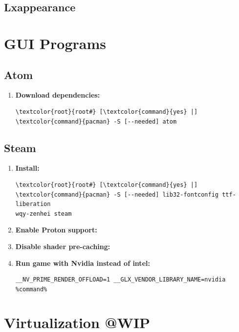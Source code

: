 \documentclass[10pt, a4paper, onecolumn, oneside, titlepage, openany]{book}
\begin{document}
\section{Lxappearance}


\chapter{GUI Programs}
\section{Atom}
\begin{enumerate}
    \item \textbf{Download dependencies:}
\begin{Verbatim}[commandchars=\\\{\}]
\textcolor{root}{root#} [\textcolor{command}{yes} |] \textcolor{command}{pacman} -S [--needed] atom
\end{Verbatim}
\end{enumerate}

\section{Steam}
\begin{enumerate}
    \item \textbf{Install:}
\begin{Verbatim}[commandchars=\\\{\}]
\textcolor{root}{root#} [\textcolor{command}{yes} |] \textcolor{command}{pacman} -S [--needed] lib32-fontconfig ttf-liberation 
wqy-zenhei steam
\end{Verbatim}    
    \item \textbf{Enable Proton support:}
\newline {}
    \item \textbf{Disable shader pre-caching:}
\newline {}
    \item \textbf{Run game with Nvidia instead of intel:}
\begin{verbatim}
__NV_PRIME_RENDER_OFFLOAD=1 __GLX_VENDOR_LIBRARY_NAME=nvidia %command%
\end{verbatim}
\end{enumerate}


\chapter{Virtualization @WIP}
\end{document}
